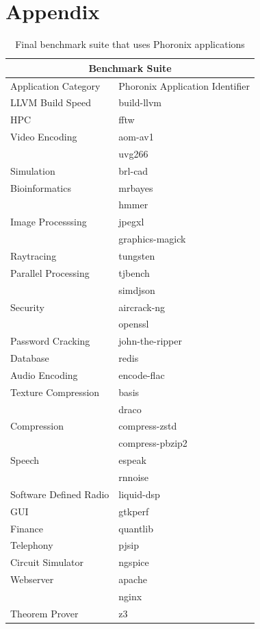 \section{Appendix} \label{sec:appendix}

\begin{table}[H]
\centering
\begin{tabular}{ |p{5cm}|p{5cm}|  }
 \hline
 \multicolumn{2}{|c|}{Benchmark Suite} \\
 \hline
 Application Category & Phoronix Application Identifier\\
 \hline
 LLVM Build Speed   & build-llvm    \\
 \hline
 HPC & fftw    \\
 \hline
 Video Encoding & aom-av1    \\
 & uvg266    \\
 \hline
 Simulation & brl-cad \\
 \hline
 Bioinformatics & mrbayes \\
 & hmmer \\
 \hline
 Image Processsing & jpegxl \\
 & graphics-magick \\
 \hline
 Raytracing & tungsten \\
 \hline
 Parallel Processing & tjbench \\
 & simdjson \\
 \hline
 Security & aircrack-ng \\
 & openssl \\
 \hline
 Password Cracking & john-the-ripper \\
 \hline
 Database & redis \\
 \hline
 Audio Encoding & encode-flac \\
 \hline
 Texture Compression & basis \\
 & draco \\
 \hline
 Compression & compress-zstd \\
 & compress-pbzip2 \\
 \hline
 Speech & espeak \\
 & rnnoise \\
 \hline
 Software Defined Radio & liquid-dsp \\
 \hline
 GUI & gtkperf \\
 \hline
 Finance & quantlib \\
 \hline
 Telephony & pjsip \\
 \hline
 Circuit Simulator & ngspice \\
 \hline
 Webserver & apache \\
 & nginx \\
 \hline
 Theorem Prover & z3 \\
 \hline
\end{tabular}
\caption{\label{tab:suite} Final benchmark suite that uses Phoronix applications}
\end{table}

